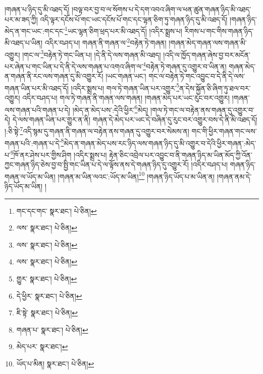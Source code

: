 །གཞན་པ་ཉིད་དུ་མི་འཐད་དོ། །བལྟ་བར་བྱ་བ་ལ་སོགས་པ་དེ་དག་འབའ་ཞིག་ལ་ཕན་ཚུན་གཞན་ཉིད་མི་འཐད་པར་མ་ཟད་ཀྱི། འདི་ལྟར་དངོས་པོ་གང་ཡང་དངོས་པོ་གང་དང་ལྷན་ཅིག་ཏུ་གཞན་ཉིད་དུ་མི་འཐད་དོ། །གཞན་ཉིད་མེད་ན་གང་ཡང་:གང་དང་\footnote{གང་དང་གང་  སྣར་ཐང་།  པེ་ཅིན། }ཡང་ལྷན་ཅིག་ཕྲད་པར་མི་འཐད་དོ། །འདིར་སྨྲས་པ། རིགས་པ་གང་གིས་གཞན་ཉིད་མི་འཐད་པ་ཡིན། འདིར་བཤད་པ། གཞན་ནི་གཞན་ལ་\footnote{ལས་  སྣར་ཐང་།  པེ་ཅིན། }བརྟེན་ཏེ་གཞན། །གཞན་མེད་གཞན་ལས་གཞན་མི་འགྱུར། །གང་ལ་\footnote{ལས་  སྣར་ཐང་།  པེ་ཅིན། }བརྟེན་ཏེ་གང་ཡིན་པ། །དེ་ནི་དེ་ལས་གཞན་མི་འཐད། །འདི་ལ་ཁྱོད་གཞན་ཞེས་བྱ་བར་མངོན་པར་ཞེན་པ་གང་ཡིན་པ་དེ་ནི་དེ་ལས་གཞན་པ་འགའ་ཞིག་ལ་\footnote{ལས་  སྣར་ཐང་།  པེ་ཅིན། }བརྟེན་ཏེ་གཞན་དུ་འགྱུར་བ་ཡིན་ན། གཞན་མེད་ན་གཞན་ནི་རང་ལས་གཞན་དུ་མི་འགྱུར་རོ། །ཡང་གཞན་ཡང་། གང་ལ་བརྟེན་ཏེ་གང་འབྱུང་བ་དེ་ནི་དེ་ལས་གཞན་ཡིན་པར་མི་འཐད་དོ། །འདིར་སྨྲས་པ། གལ་ཏེ་གཞན་ཡིན་པར་འགྱུར་\footnote{གྱུར་  སྣར་ཐང་།  པེ་ཅིན། }ན་དེས་སྐྱོན་ཅི་ཞིག་ཏུ་ཐལ་བར་འགྱུར། འདིར་བཤད་པ། གལ་ཏེ་གཞན་ནི་གཞན་ལས་གཞན། །གཞན་མེད་པར་ཡང་རུང་བར་འགྱུར། །གཞན་ལས་གཞན་པའི་གཞན་པ་དེ། །མེད་ན་མེད་པས་:དེའི་ཕྱིར་\footnote{དེ་ཕྱིར་  སྣར་ཐང་།  པེ་ཅིན། }མེད། །གལ་ཏེ་གང་ལ་བརྟེན་ནས་གཞན་དུ་འགྱུར་བ་དེ། དེ་ལས་གཞན་ཡིན་པར་གྱུར་ན་ནི། གཞན་དེ་མེད་པར་ཡང་དེ་བཞིན་དུ་རུང་བར་འགྱུར་བས་དེ་ནི་མི་འཐད་དོ། །:ཅི་སྟེ་\footnote{ཇི་སྟེ་  སྣར་ཐང་།  པེ་ཅིན། }འདི་སྙམ་དུ་གཞན་ནི་གཞན་ལ་བརྟེན་ནས་གཞན་དུ་འགྱུར་བར་སེམས་ན། གང་གི་ཕྱིར་གཞན་གང་ལས་གཞན་པའི་:གཞན་པ་དེ་\footnote{གཞན་པ་  སྣར་ཐང་།  པེ་ཅིན། }མེད་ན་གཞན་མེད་པས་རང་ཉིད་ལས་གཞན་ཉིད་དུ་མི་འགྱུར་བ་དེའི་ཕྱིར་གཞན་:མེད་པ་\footnote{མེད་པར་  སྣར་ཐང་། }ཁོ་ནར་ཤེས་པར་གྱིས་ཤིག །འདིར་སྨྲས་པ། རྟེན་ཅིང་འབྲེལ་པར་འབྱུང་བ་ནི་གཞན་ཉིད་མ་ཡིན་མོད་ཀྱི་འོན་ཀྱང་གཞན་ཉིད་ཅེས་བྱ་བ་སྤྱི་གང་ཡིན་པ་དེ་ལ་ལྟོས་ནས་དེ་གཞན་ཉིད་དུ་འགྱུར་རོ། །འདིར་བཤད་པ། གཞན་ཉིད་གཞན་ལ་ཡོད་མ་ཡིན། །གཞན་མ་ཡིན་ལའང་:ཡོད་མ་ཡིན།\footnote{ཡོད་པ་མིན།  སྣར་ཐང་།  པེ་ཅིན། } །གཞན་ཉིད་ཡོད་པ་མ་ཡིན་ན། །གཞན་ནམ་དེ་ཉིད་ཡོད་མ་ཡིན། །
